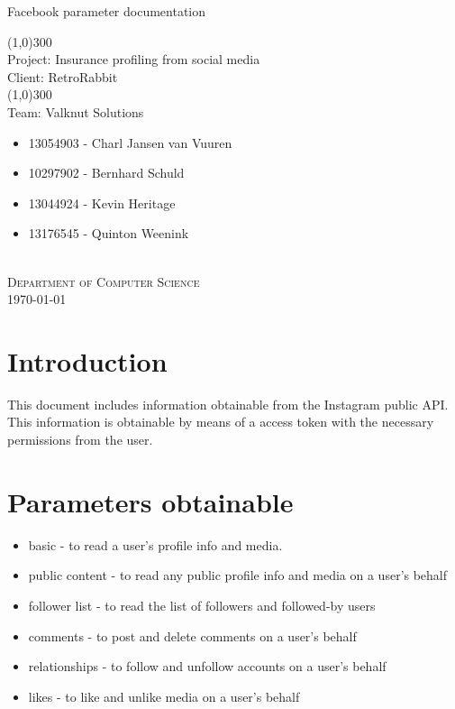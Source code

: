 \documentclass{article}
\begin{document}
	\begin{titlepage}
		\begin{center}
		
			\huge{
			Facebook parameter documentation\\
			}
			
			\line(1,0){300}\\
			[0.2cm]
			\LARGE{Project: Insurance profiling from social media\\
			Client: RetroRabbit} \\
			\line(1,0){300}\\
			\LARGE{Team: Valknut Solutions}\\
			[1.0cm]
			\large
			{
			\begin{itemize}
				\item 13054903 - Charl Jansen van Vuuren 
				\item 10297902 - Bernhard Schuld      
				\item 13044924 - Kevin Heritage
				\item 13176545 - Quinton Weenink\\
			\end{itemize}
			}
			\textsc{\large}\\
		[3.0cm]
		\textsc{\large  Department of Computer Science}\\
		[0.5cm]
		\textsc{\large \today}\\
		\end{center}

	\end{titlepage}
	\cleardoublepage
	\tableofcontents
	\cleardoublepage

\section{Introduction}
This document includes information obtainable from the Instagram public API. This information is obtainable by means of a access token with the necessary permissions from the user.
\section{Parameters obtainable}
\begin{itemize}
	\item basic - to read a user’s profile info and media.
	\item public content - to read any public profile info and media on a user’s behalf
	\item follower list - to read the list of followers and followed-by users
	\item comments - to post and delete comments on a user’s behalf
	\item relationships - to follow and unfollow accounts on a user’s behalf
	\item likes - to like and unlike media on a user’s behalf
\end{itemize}
\end{document}
